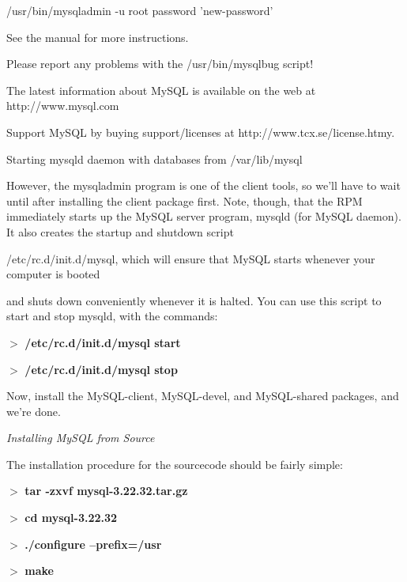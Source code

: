 \documentclass[a4paper,11pt]{book}
\begin{document}
\noindent /usr/bin/mysqladmin -u root password 'new-password'

\noindent See the manual for more instructions.

\noindent 

\noindent Please report any problems with the /usr/bin/mysqlbug script!

\noindent 

\noindent The latest information about MySQL is available on the web at http://www.mysql.com

\noindent Support MySQL by buying support/licenses at http://www.tcx.se/license.htmy.

\noindent 

\noindent Starting mysqld daemon with databases from /var/lib/mysql

\noindent 

\noindent However, the mysqladmin program is one of the client tools, so we'll have to wait until after installing the client package first. Note, though, that the RPM immediately starts up the MySQL server program, mysqld (for MySQL daemon). It also creates the startup and shutdown script

\noindent /etc/rc.d/init.d/mysql, which will ensure that MySQL starts whenever your computer is booted

\noindent and shuts down conveniently whenever it is halted. You can use this script to start and stop mysqld, with the commands:

\noindent 

\noindent $>$ \textbf{/etc/rc.d/init.d/mysql start}

\noindent $>$ \textbf{/etc/rc.d/init.d/mysql stop}

\noindent 

\noindent Now, install the MySQL-client, MySQL-devel, and MySQL-shared packages, and we're done.

\noindent 

\noindent \textit{Installing MySQL from Source}

\noindent The installation procedure for the sourcecode should be fairly simple:

\noindent 

\noindent $>$ \textbf{tar -zxvf mysql-3.22.32.tar.gz}

\noindent $>$ \textbf{cd mysql-3.22.32}

\noindent $>$ \textbf{./configure --prefix=/usr}

\noindent $>$ \textbf{make}
\end{document}
